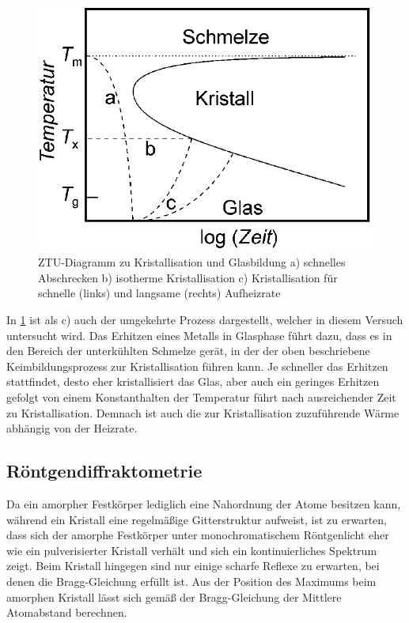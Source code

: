 \documentclass[
	a4paper,
	12pt,
	pagesize,
	ngerman
]{scrartcl}
\begin{document}
	\begin{figure}[H]
			\includegraphics[width= 0.7 \linewidth]{img/kristallisierung}
			\caption{
			ZTU-Diagramm zu Kristallisation und Glasbildung
			a) schnelles Abschrecken
			b) isotherme Kristallisation
			c) Kristallisation für schnelle (links) und langsame (rechts) Aufheizrate
			\cite{anleitung}
			}
			\label{fig_kristallisierung}
	\end{figure}

	In \cref{fig_kristallisierung} ist als c) auch der umgekehrte Prozess dargestellt, welcher in diesem Versuch untersucht wird.
	Das Erhitzen eines Metalls in Glasphase führt dazu, dass es in den Bereich der unterkühlten Schmelze gerät, in der der oben beschriebene Keimbildungsprozess zur Kristallisation führen kann.
	Je schneller das Erhitzen stattfindet, desto eher kristallisiert das Glas, aber auch ein geringes Erhitzen gefolgt von einem Konstanthalten der Temperatur führt nach ausreichender Zeit zu Kristallisation.
	Demnach ist auch die zur Kristallisation zuzuführende Wärme abhängig von der Heizrate.

	\subsection{Röntgendiffraktometrie}
	Da ein amorpher Festkörper lediglich eine Nahordnung der Atome besitzen kann, während ein Kristall eine regelmäßige Gitterstruktur aufweist, ist zu erwarten, dass sich der amorphe Festkörper unter monochromatischem Röntgenlicht eher wie ein pulverisierter Kristall verhält und sich ein kontinuierliches Spektrum zeigt.
	Beim Kristall hingegen sind nur einige scharfe Reflexe zu erwarten, bei denen die Bragg-Gleichung erfüllt ist. %
	Aus der Position des Maximums beim amorphen Kristall lässt sich gemäß der Bragg-Gleichung der Mittlere Atomabstand berechnen.
\end{document}
